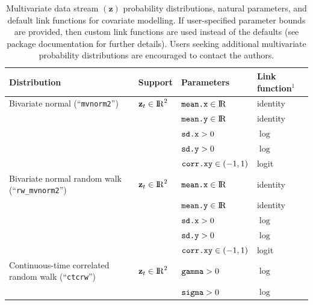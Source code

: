 \documentclass[12pt]{article}\usepackage[]{graphicx}\usepackage[]{xcolor}
\begin{document}
\begin{small}
\begin{table}
  \caption{\label{tab:multipdfs} Multivariate data stream $({\mathbf z})$ probability distributions, natural parameters, and default link functions for covariate modelling. If user-specified parameter bounds are provided, then custom link functions are used instead of the defaults (see package documentation for further details). Users seeking additional multivariate probability distributions are encouraged to contact the authors.}
  \begin{tabular}{llll}
  \toprule
  Distribution                                          & Support                         & Parameters                       & Link function$^1$ \tabularnewline
  \midrule
  \rowcolor{Gray} Bivariate normal (``\verb|mvnorm2|'') & ${\mathbf z_t}\in{\rm I\!R}^2$  & $\verb|mean.x|\in{\rm I\!R}$     &  identity \tabularnewline  
  \rowcolor{Gray}                                       &                                 & $\verb|mean.y|\in{\rm I\!R}$     &  identity \tabularnewline  
  \rowcolor{Gray}                                       &                                 & $\verb|sd.x|>0$               &  $\log$ \tabularnewline          
  \rowcolor{Gray}                                       &                                 & $\verb|sd.y|>0$               &  $\log$ \tabularnewline  
  \rowcolor{Gray}                                       &                                 & $\verb|corr.xy|\in(-1,1)$   &  logit \tabularnewline                                            
  Bivariate normal random walk (``\verb|rw_mvnorm2|'')  & ${\mathbf z_t}\in{\rm I\!R}^2$  & $\verb|mean.x|\in{\rm I\!R}$     &  identity \tabularnewline  
                                                        &                                 & $\verb|mean.y|\in{\rm I\!R}$     &  identity \tabularnewline  
                                                        &                                 & $\verb|sd.x|>0$               &  $\log$ \tabularnewline                                                                                                 &                                 & $\verb|sd.y|>0$               &  $\log$ \tabularnewline
                                                        &                                 & $\verb|corr.xy|\in(-1,1)$   &  logit \tabularnewline    
  \rowcolor{Gray} Continuous-time correlated random walk (``\verb|ctcrw|'')& ${\mathbf z_t}\in{\rm I\!R}^2$  & $\verb|gamma|>0$         & $\log$ \tabularnewline
  \rowcolor{Gray}                                                          &                                 & $\verb|sigma|>0$         & $\log$ \tabularnewline

\end{tabular}
\end{table}
\end{small}
\end{document}
